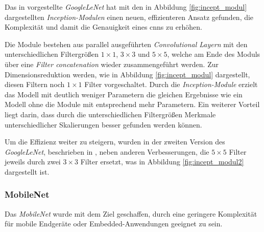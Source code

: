 Das in \cite{szegedyGoingDeeperConvolutions2014} 
vorgestellte \textit{GoogleLeNet} hat mit den in 
Abbildung \ref{fig:incept_modul} dargestellten
\textit{Inception-Modulen} einen neuen, 
effizienteren Ansatz gefunden, die 
Komplexität und damit die Genauigkeit eines 
\Glspl{cnn} zu erhöhen.

Die Module bestehen aus parallel ausgeführten 
\textit{Convolutional Layern} mit den 
unterschiedlichen Filtergrößen $1\times1$,
 $3\times3$ und $5\times5$, welche 
am Ende des Moduls über eine \textit{Filter 
concatenation} wieder zusammengeführt werden.
Zur Dimensionsreduktion werden, wie in 
Abbildung \ref{fig:incept_modul} dargestellt,
diesen Filtern noch $1\times1$ Filter vorgeschaltet.
Durch die \textit{Inception-Module} erzielt das Modell 
mit deutlich weniger 
Parametern die gleichen Ergebnisse
wie ein Modell ohne die Module mit entsprechend mehr Parametern.
Ein weiterer Vorteil liegt darin, dass durch die 
unterschiedlichen Filtergrößen Merkmale 
unterschiedlicher Skalierungen besser gefunden 
werden können.

Um die Effizienz weiter zu steigern, wurden in 
der zweiten Version des \textit{GoogleLeNet}, beschrieben in
\cite{szegedyRethinkingInceptionArchitecture2015},
neben anderen Verbesserungen, die 
$5\times5$ Filter jeweils durch zwei $3\times3$ Filter 
ersetzt, was in Abbildung \ref{fig:incept_modul2}
dargestellt ist.
\vspace{1cm}

\begin{minipage}{0.45\textwidth}
    \centering
    
    \label{fig:incept_modul}
\end{minipage}
\begin{minipage}{0.1\textwidth}
    \hfill
\end{minipage}
\begin{minipage}{0.45\textwidth}
    \centering
    
    \label{fig:incept_modul2}
\end{minipage}

\newpage
\subsubsection{MobileNet}
Das \textit{MobileNet} \cite{howardMobileNetsEfficientConvolutional2017a}
wurde mit dem Ziel geschaffen, durch eine geringere 
Komplexität für mobile Endgeräte oder Embedded-Anwendungen 
geeignet zu sein.

